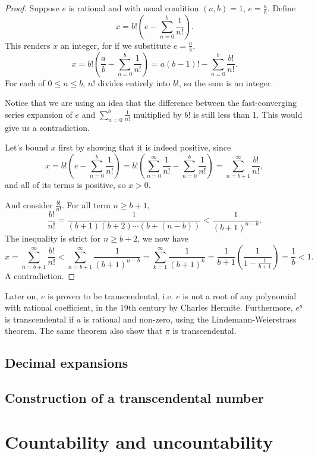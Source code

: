 \documentclass[main.tex]{subfiles}
\begin{document}
		\begin{proof}
			Suppose $e$ is rational and with usual condition $(a,b) = 1$, $e = \frac{a}{b}$. Define
			\begin{equation}
				x = b!\left(e - \sum_{n = 0}^{b} \frac{1}{n!}\right).
			\end{equation}
			This renders $x$ an integer, for if we substitute $e = \frac{a}{b}$,
			\begin{equation*}
				x = b!\left(\frac{a}{b} - \sum_{n = 0}^{b} \frac{1}{n!}\right) = a(b - 1)! - \sum_{n = 0}^{b} \frac{b!}{n!}.
			\end{equation*}
			For each of $0 \leq n \leq b$, $n!$ divides entirely into $b!$, so the sum is an integer.
			
			Notice that we are using an idea that the difference between the fast-converging series expansion of $e$ and $\sum_{n = 0}^{b} \frac{1}{n!}$ multiplied by $b!$ is still less than 1. This would give us a contradiction.
			
			Let's bound $x$ first by showing that it is indeed positive, since
			\begin{equation}
			x = b!\left(e - \sum_{n = 0}^{b} \frac{1}{n!}\right) = b!\left(\sum_{n = 0}^{\infty} \frac{1}{n!} - \sum_{n = 0}^{b} \frac{1}{n!}\right) = \sum_{n = b + 1}^{\infty} \frac{b!}{n!},
			\end{equation}
			and all of its terms is positive, so $x > 0$.
			
			And consider $\frac{b!}{n!}$. For all term $n \geq b + 1$,
			\begin{equation*}
				\frac{b!}{n!} = \frac{1}{(b + 1)(b + 2)\cdots(b + (n - b))} < \frac{1}{(b + 1)^{n - b}}.
			\end{equation*}
			The inequality is strict for $n \geq b + 2$, we now have
			\begin{equation}
				x = \sum_{n = b + 1}^{\infty} \frac{b!}{n!} < \sum_{n = b + 1}^{\infty} \frac{1}{(b + 1)^{n - b}} = \sum_{k = 1}^{\infty} \frac{1}{(b + 1)^{k}} = \frac{1}{b + 1}\left(\frac{1}{1 - \frac{1}{b + 1}}\right) = \frac{1}{b} < 1.
			\end{equation}
			A contradiction.
		\end{proof}
		Later on, $e$ is proven to be transcendental, i.e. $e$ is not a root of any polynomial with rational coefficient, in the 19th century by Charles Hermite. Furthermore, $e^a$ is transcendental if $a$ is rational and non-zero, using the Lindemann-Weierstrass theorem. The same theorem also show that $\pi$ is transcendental.
		\subsection{Decimal expansions}
		
		\subsection{Construction of a transcendental number}
	\section{Countability and uncountability}
		
	
\end{document}
